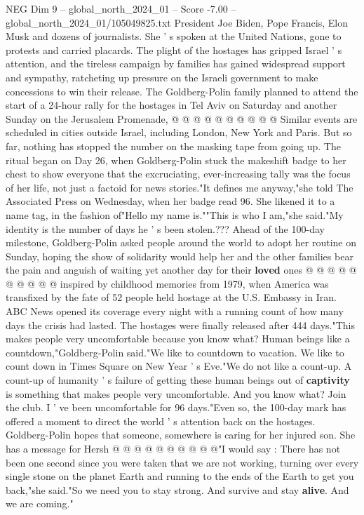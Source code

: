 \begin{textsample}{NEG Dim 9 – global\_north\_2024\_01 – Score -7.00 – global\_north\_2024\_01/105049825.txt}
President Joe Biden, Pope Francis, Elon Musk and dozens of journalists.
She ' s spoken at the United Nations, gone to protests and carried placards.
The plight of the hostages has gripped Israel ' s attention, and the tireless campaign by families has gained widespread support and sympathy, ratcheting up pressure on the Israeli government to make concessions to win their release.
The Goldberg-Polin family planned to attend the start of a 24-hour rally for the hostages in Tel Aviv on Saturday and another Sunday on the Jerusalem Promenade, @ @ @ @ @ @ @ @ @ @ Similar events are scheduled in cities outside Israel, including London, New York and Paris.
But so far, nothing has stopped the number on the masking tape from going up.
The ritual began on Day 26, when Goldberg-Polin stuck the makeshift badge to her chest to show everyone that the excruciating, ever-increasing tally was the focus of her life, not just a factoid for news stories."It defines me anyway,"she told The Associated Press on Wednesday, when her badge read 96.
She likened it to a name tag, in the fashion of"Hello my name is.""This is who I am,"she said."My identity is the number of days he ' s been stolen.???
Ahead of the 100-day milestone, Goldberg-Polin asked people around the world to adopt her routine on Sunday, hoping the show of solidarity would help her and the other families bear the pain and anguish of waiting yet another day for their \textbf{loved} ones @ @ @ @ @ @ @ @ @ @ inspired by childhood memories from 1979, when America was transfixed by the fate of 52 people held hostage at the U.S.
Embassy in Iran.
ABC News opened its coverage every night with a running count of how many days the crisis had lasted.
The hostages were finally released after 444 days."This makes people very uncomfortable because you know what?
Human beings like a countdown,"Goldberg-Polin said."We like to countdown to vacation.
We like to count down in Times Square on New Year ' s Eve."We do not like a count-up.
A count-up of humanity ' s failure of getting these human beings out of \textbf{captivity} is something that makes people very uncomfortable.
And you know what?
Join the club.
I ' ve been uncomfortable for 96 days."Even so, the 100-day mark has offered a moment to direct the world ' s attention back on the hostages.
Goldberg-Polin hopes that someone, somewhere is caring for her injured son.
She has a message for Hersh @ @ @ @ @ @ @ @ @ @"I would say : There has not been one second since you were taken that we are not working, turning over every single stone on the planet Earth and running to the ends of the Earth to get you back,"she said."So we need you to stay strong.
And survive and stay \textbf{alive}.
And we are coming."

\end{textsample}
